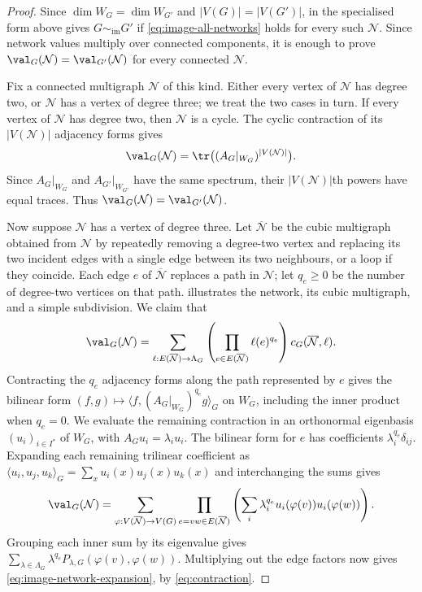 \begin{proof}
Since $\dim W_G=\dim W_{G'}$ and $|V(G)|=|V(G')|$, \cite[Theorem~9]{Young2025} in the specialised form above
gives $G\sim_{\mathrm{im}}G'$ if \cref{eq:image-all-networks} holds
for every such $\mathcal N$.
Since network values multiply over connected components, it is enough
to prove $\val_G(\mathcal N)=\val_{G'}(\mathcal N)$ for every connected $\mathcal N$.

Fix a connected multigraph $\mathcal N$ of this kind. Either every vertex of
$\mathcal N$ has degree two, or $\mathcal N$ has a vertex of degree three; we treat the
two cases in turn.
If every vertex of $\mathcal N$ has degree two, then $\mathcal N$ is a cycle.
The cyclic contraction of its $|V(\mathcal N)|$ adjacency forms gives
\begin{equation}\label{eq:degree-two-trace}
 \val_G(\mathcal N)=\tr\bigl((A_G|_{W_G})^{|V(\mathcal N)|}\bigr).
\end{equation}
Since $A_G|_{W_G}$ and $A_{G'}|_{W_{G'}}$ have the same spectrum,
their $|V(\mathcal N)|$th powers have equal traces. Thus $\val_G(\mathcal N)=\val_{G'}(\mathcal N)$.

Now suppose $\mathcal N$ has a vertex of degree three.
Let $\overline{\mathcal N}$ be the cubic multigraph obtained from $\mathcal N$ by repeatedly
removing a degree-two vertex and replacing its two incident edges with
a single edge between its two neighbours, or a loop if they coincide.
Each edge $e$ of $\overline{\mathcal N}$ replaces a path in $\mathcal N$; let
$q_e\geq0$ be the number of degree-two vertices on that path.
 illustrates the network, its cubic multigraph,
and a simple subdivision.
We claim that
\begin{equation}\label{eq:image-network-expansion}
 \val_G(\mathcal N)=\sum_{\ell:E(\overline{\mathcal N})\to\Lambda_G}
 \left(\prod_{e\in E(\overline{\mathcal N})}\ell(e)^{q_e}\right)c_G(\overline{\mathcal N},\ell).
\end{equation}
Contracting the $q_e$ adjacency forms along the path represented by $e$
gives the bilinear form
$(f,g)\mapsto\langle f,(A_G|_{W_G})^{q_e}g\rangle_G$ on $W_G$,
including the inner product when $q_e=0$.
We evaluate the remaining contraction in an orthonormal eigenbasis
$(u_i)_{i\in I^*}$ of $W_G$, with $A_Gu_i=\lambda_i u_i$.
The bilinear form for $e$ has coefficients $\lambda_i^{q_e}\delta_{ij}$.
Expanding each remaining trilinear coefficient as
$\langle u_i,u_j,u_k\rangle_G=\sum_xu_i(x)u_j(x)u_k(x)$ and
interchanging the sums gives
\begin{equation}\label{eq:image-network-vertex-expansion}
 \val_G(\mathcal N)=\sum_{\varphi:V(\overline{\mathcal N})\to V(G)}
 \prod_{e=vw\in E(\overline{\mathcal N})}
 \left(\sum_i\lambda_i^{q_e}u_i(\varphi(v))u_i(\varphi(w))\right).
\end{equation}
Grouping each inner sum by its eigenvalue gives
$\sum_{\lambda\in\Lambda_G}\lambda^{q_e}P_{\lambda,G}(\varphi(v),\varphi(w))$.
Multiplying out the edge factors now gives
\cref{eq:image-network-expansion}, by \cref{eq:contraction}.


\end{proof}
